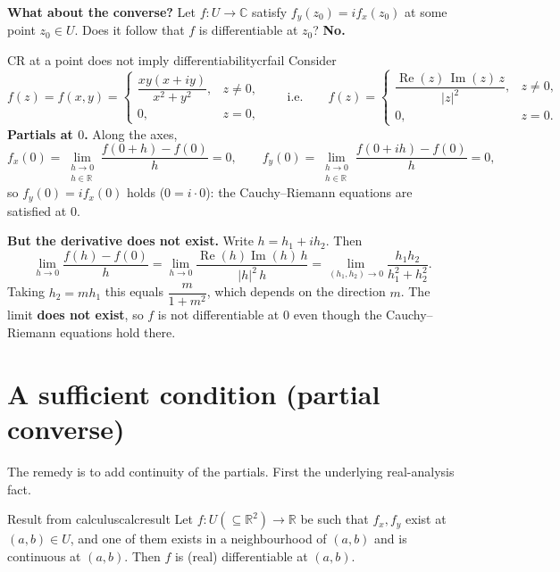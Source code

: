 \documentclass[11pt,openany]{report}
\newcommand{\C}{\mathbb{C}}
\newcommand{\R}{\mathbb{R}}
\renewcommand{\Re}{\operatorname{Re}}
\renewcommand{\Im}{\operatorname{Im}}
\newcommand{\abs}[1]{\left\lvert #1 \right\rvert}
\begin{document}
\begin{caution}
\textbf{What about the converse?} Let $f:U\to\C$ satisfy $f_y(z_0)=i f_x(z_0)$ at some
point $z_0\in U$. Does it follow that $f$ is differentiable at $z_0$? \textbf{No.}
\end{caution}

\begin{example}{CR at a point does not imply differentiability}{crfail}
Consider
\[
  f(z) = f(x,y) =
  \begin{cases}
    \dfrac{xy(x+iy)}{x^2+y^2}, & z\ne0,\\[8pt]
    0, & z=0,
  \end{cases}
  \qquad\text{i.e.}\qquad
  f(z)=\begin{cases}\dfrac{\Re(z)\,\Im(z)\,z}{\abs{z}^2}, & z\ne0,\\[6pt] 0, & z=0.\end{cases}
\]
\textbf{Partials at $0$.} Along the axes,
\[
  f_x(0)=\lim_{\substack{h\to0\\ h\in\R}}\frac{f(0+h)-f(0)}{h}=0,\qquad
  f_y(0)=\lim_{\substack{h\to0\\ h\in\R}}\frac{f(0+ih)-f(0)}{h}=0,
\]
so $f_y(0)=i f_x(0)$ holds ($0=i\cdot0$): the Cauchy--Riemann equations are satisfied at
$0$.

\textbf{But the derivative does not exist.} Write $h=h_1+ih_2$. Then
\[
  \lim_{h\to0}\frac{f(h)-f(0)}{h}
  = \lim_{h\to0}\frac{\Re(h)\Im(h)\,h}{\abs{h}^2\,h}
  = \lim_{(h_1,h_2)\to0}\frac{h_1 h_2}{h_1^2+h_2^2}.
\]
Taking $h_2=m h_1$ this equals $\dfrac{m}{1+m^2}$, which depends on the direction $m$.
The limit \textbf{does not exist}, so $f$ is not differentiable at $0$ even though the
Cauchy--Riemann equations hold there.
\end{example}

\section{A sufficient condition (partial converse)}

The remedy is to add continuity of the partials. First the underlying real-analysis fact.

\begin{theorem}{Result from calculus}{calcresult}
Let $f:U(\subseteq\R^2)\to\R$ be such that $f_x,f_y$ exist at $(a,b)\in U$, and one of them
exists in a neighbourhood of $(a,b)$ and is continuous at $(a,b)$. Then $f$ is
(real) differentiable at $(a,b)$.
\end{theorem}
\end{document}
